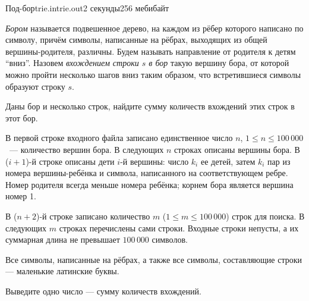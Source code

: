 \begin{problem}{Под-бор}{trie.in}{trie.out}{2 секунды}{256 мебибайт}


\emph{Бором} называется подвешенное дерево, на каждом из рёбер которого
написано по символу, причём символы, написанные на рёбрах,
выходящих из общей вершины-родителя, различны.
Будем называть направление от родителя к детям ``вниз''. 
Назовем \emph{вхождением строки $s$ в бор} такую вершину бора, от которой
можно пройти несколько шагов вниз таким образом, что встретившиеся символы
образуют строку $s$.

Даны бор и несколько строк, найдите сумму количеств вхождений этих строк
в этот бор.

\InputFile

В первой строке входного файла записано единственное число $n$, $1 \le n \le 100\,000$~---
количество вершин бора.
В следующих $n$ строках описаны вершины бора. В ($i+1$)-й строке описаны дети $i$-й вершины:
число $k_i$ ее детей, затем $k_i$ пар из номера вершины-ребёнка и символа,
написанного на соответствующем ребре. Номер родителя всегда меньше номера
ребёнка; корнем бора является вершина номер 1.

В ($n+2$)-й строке записано количество $m$ ($1 \le m \le 100\,000$) строк для поиска.
В следующих $m$ строках перечислены сами строки. Входные строки непусты, а их суммарная
длина не превышает $100\,000$ символов.

Все символы, написанные на рёбрах, а также все символы, составляющие строки --- маленькие
латинские буквы.

\OutputFile

Выведите одно число --- сумму количеств вхождений.

\Example
\begin{example}
%
\end{example}

\end{problem}
